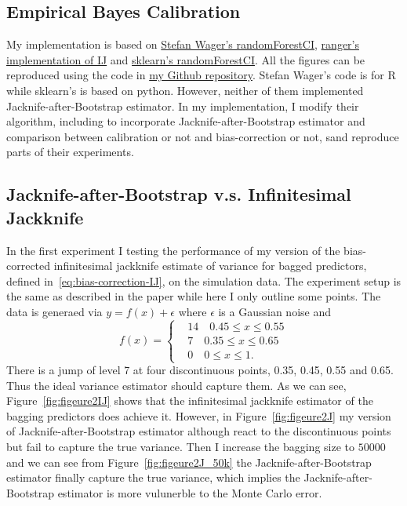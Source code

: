 \documentclass[11pt]{article}
\begin{document}
\subsection{Empirical Bayes Calibration}
My implementation is based on \href{https://github.com/swager/randomForestCI}{Stefan Wager's randomForestCI}, \href{https://github.com/imbs-hl/ranger/blob/master/R/infinitesimalJackknife.R}{ranger's implementation of IJ} and \href{https://github.com/scikit-learn-contrib/forest-confidence-interval}{sklearn's randomForestCI}.
All the figures can be reproduced using the code in \href{https://github.com/liangzp/MATH-5472}{my Github repository}.
Stefan Wager's code is for R while sklearn's is based on python. 
However, neither of them implemented Jacknife-after-Bootstrap estimator.
In my implementation, I modify their algorithm, including to incorporate Jacknife-after-Bootstrap estimator and comparison between calibration or not and bias-correction or not, sand reproduce parts of their experiments.

\subsection{Jacknife-after-Bootstrap v.s. Infinitesimal Jackknife}
\label{sec:Figure_2}
In the first experiment I testing the performance of my version of the bias-corrected infinitesimal jackknife estimate of variance for bagged predictors, defined in~\ref{eq:bias-correction-IJ}, on the simulation data.
The experiment setup is the same as described in the paper while here I only outline some points.
The data is generaed via $y=f(x)+\epsilon$ where $\epsilon$ is a Gaussian noise and 
\begin{equation}
	f(x)=\left\{
	\begin{aligned}
	&14 \quad 0.45 \le x\le 0.55\\
	&7 \quad 0.35 \le x\le 0.65\\
	&0 \quad 0\le x\le 1.
	\end{aligned}
	\right
	.
\end{equation}
There is a jump of level 7 at four discontinuous points, 0.35, 0.45, 0.55 and 0.65. 
Thus the ideal variance estimator should capture them.
As we can see, Figure~\ref{fig:figeure2IJ} shows that the infinitesimal jackknife estimator of the bagging predictors does achieve it.
However, in Figure~\ref{fig:figeure2J} my version of Jacknife-after-Bootstrap estimator although react to the discontinuous points but fail to capture the true variance.
Then I increase the bagging size to $50000$ and we can see from Figure~\ref{fig:figeure2J_50k} the Jacknife-after-Bootstrap estimator finally capture the true variance, which implies the Jacknife-after-Bootstrap estimator is more vulunerble to the Monte Carlo error.
\end{document}
